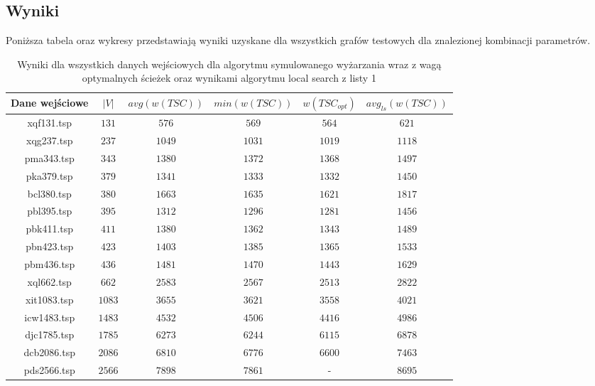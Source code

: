 \documentclass[12pt]{article}
\begin{document}
    \newpage

    \subsection{Wyniki}
        Poniższa tabela oraz wykresy przedstawiają wyniki uzyskane dla wszystkich grafów testowych dla
        znalezionej kombinacji parametrów.

        \begin{table}[h!]
        \centering
        \begin{tabularx}{0.91\textwidth}{| c | c | c | c | c | c |}
            \hline
            Dane wejściowe & $|V|$ & $avg(w(TSC))$ & $min(w(TSC))$ & $w(TSC_{opt})$ & $avg_{ls}(w(TSC))$ \\
            \hline
            xqf131.tsp  & $131$  & $576$  & $569$  & $564$  & $621$ \\
            xqg237.tsp  & $237$  & $1049$ & $1031$ & $1019$ & $1118$ \\
            pma343.tsp  & $343$  & $1380$ & $1372$ & $1368$ & $1497$ \\
            pka379.tsp  & $379$  & $1341$ & $1333$ & $1332$ & $1450$ \\
            bcl380.tsp  & $380$  & $1663$ & $1635$ & $1621$ & $1817$ \\
            pbl395.tsp  & $395$  & $1312$ & $1296$ & $1281$ & $1456$ \\
            pbk411.tsp  & $411$  & $1380$ & $1362$ & $1343$ & $1489$ \\
            pbn423.tsp  & $423$  & $1403$ & $1385$ & $1365$ & $1533$ \\
            pbm436.tsp  & $436$  & $1481$ & $1470$ & $1443$ & $1629$ \\
            xql662.tsp  & $662$  & $2583$ & $2567$ & $2513$ & $2822$ \\
            xit1083.tsp & $1083$ & $3655$ & $3621$ & $3558$ & $4021$ \\
            icw1483.tsp & $1483$ & $4532$ & $4506$ & $4416$ & $4986$ \\
            djc1785.tsp & $1785$ & $6273$ & $6244$ & $6115$ & $6878$ \\
            dcb2086.tsp & $2086$ & $6810$ & $6776$ & $6600$ & $7463$ \\
            pds2566.tsp & $2566$ & $7898$ & $7861$ & -      & $8695$ \\
            \hline
        \end{tabularx}
        \label{table:sa_result}
        \caption{Wyniki dla wszystkich danych wejściowych dla algorytmu symulowanego wyżarzania wraz z
        wagą optymalnych ścieżek oraz wynikami algorytmu local search z listy 1}
        \end{table}
\end{document}
